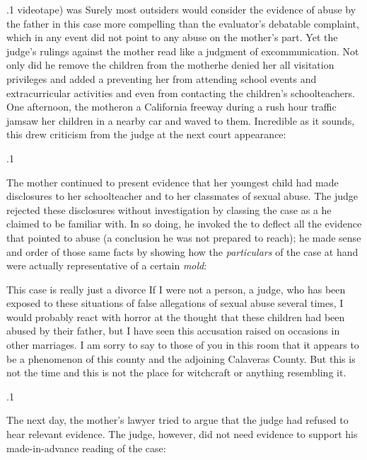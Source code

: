\documentclass[11pt, twoside]{article}
\begin{document}
{\p.1{%
videotape) was  Surely most outsiders would consider the evidence of abuse
by the father in this case more compelling than the evaluator’s debatable
complaint, which in any event did not point to any abuse on the mother’s
part. Yet the judge’s rulings against the mother read like a judgment
of excommunication. Not only did he remove the children from the
mother\mdash{}he denied her all visitation privileges and added a  preventing her from attending school events and extracurricular
activities and even from contacting the children’s schoolteachers.
One afternoon, the mother\mdash{}on a California freeway during a
rush hour traffic jam\mdash{}saw her children in a nearby car and waved
to them. Incredible as it sounds, this drew criticism from the judge
at the next court appearance: 
}%

\p.1{%
The mother continued to present evidence that her youngest child
had made disclosures to her schoolteacher and to her classmates of sexual abuse. The judge rejected these disclosures without investigation by
classing the case as a  he claimed to be familiar with. In so doing,
he invoked the  to deflect all
the evidence that pointed to abuse (a conclusion he was not prepared to
reach); he made sense and order of those same facts by showing how the
\textit{particulars} of the case at hand were actually representative of a certain
\textit{mold}:

\begin{blockQuote}
This case is really just a divorce\ellFour{2pt}{2pt} If I were not a person, a judge,
who has been exposed to these situations of false allegations of sexual abuse several times, I would probably react with horror at the
thought that these children had been abused by their father, but I
have seen this accusation raised on occasions in other marriages. I
am sorry to say to those of you in this room that it appears to be a
phenomenon of this county and the adjoining Calaveras County.
But this is not the time and this is not the place for witchcraft or
anything resembling it.
\end{blockQuote}

}%

\p.1{%
The next day, the mother’s lawyer tried to argue that the judge had
refused to hear relevant evidence. The judge, however, did not need
evidence to support his made-in-advance reading of the case:

}}
\end{document}
